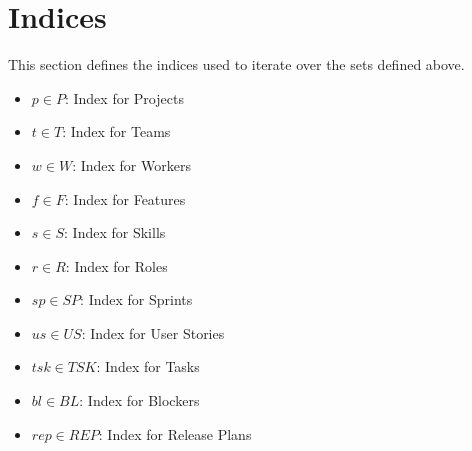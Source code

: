 \documentclass[11pt]{article}
\begin{document}
\section{Indices}
This section defines the indices used to iterate over the sets defined above.
\begin{itemize}
    \item $p \in P$: Index for Projects
    \item $t \in T$: Index for Teams
    \item $w \in W$: Index for Workers
    \item $f \in F$: Index for Features
    \item $s \in S$: Index for Skills
    \item $r \in R$: Index for Roles
    \item $sp \in SP$: Index for Sprints
    \item $us \in US$: Index for User Stories
    \item $tsk \in TSK$: Index for Tasks
    \item $bl \in BL$: Index for Blockers
    \item $rep \in REP$: Index for Release Plans
\end{itemize}
\end{document}
